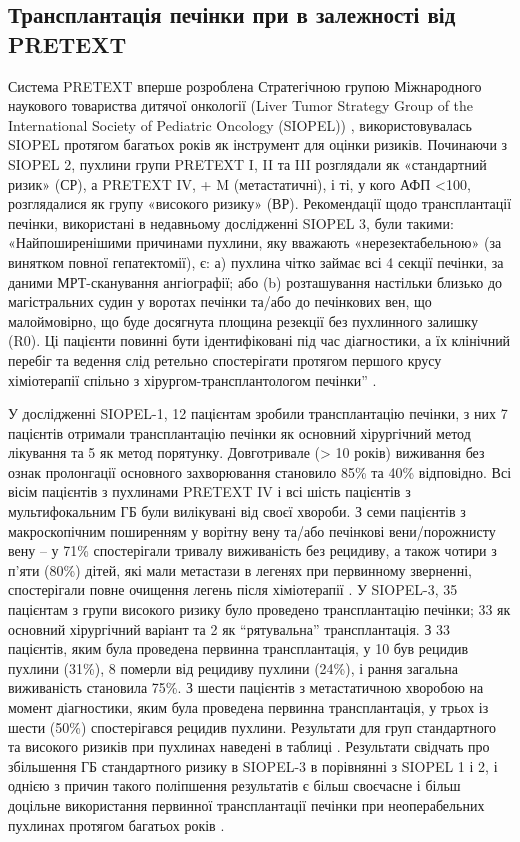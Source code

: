 \subsection{Трансплантація печінки при в залежності від PRETEXT}
Система PRETEXT вперше розроблена Стратегічною групою Міжнародного наукового товариства дитячої онкології (Liver Tumor Strategy Group of the International Society of Pediatric Oncology (SIOPEL)) \cite{pmid24362406}, використовувалась SIOPEL протягом багатьох років як інструмент для оцінки ризиків. Починаючи з SIOPEL 2, пухлини групи PRETEXT I, II та III розглядали як «стандартний ризик» (СР), а PRETEXT IV, + M (метастатичні), і ті, у кого АФП <100, розглядалися  як групу «високого ризику» (ВР). Рекомендації щодо трансплантації печінки, використані в недавньому дослідженні SIOPEL 3, були такими: «Найпоширенішими причинами пухлини, яку вважають «нерезектабельною» (за винятком повної гепатектомії), є: а) пухлина чітко займає всі 4 секції печінки, за даними МРТ-сканування  ангіографії; або (b) розташування настільки близько до магістральних судин у воротах печінки та/або до печінкових вен, що малоймовірно, що буде досягнута площина резекції без пухлинного залишку (R0). Ці пацієнти повинні бути ідентифіковані під час діагностики, а їх клінічний перебіг та ведення слід ретельно спостерігати протягом першого крусу хіміотерапії спільно з хірургом-трансплантологом печінки” \cite{pmid14966739}.

У дослідженні SIOPEL-1, 12 пацієнтам зробили трансплантацію печінки, з них 7 пацієнтів отримали трансплантацію печінки як основний хірургічний метод лікування та 5 як метод порятунку. Довготривале (> 10 років) виживання без ознак пролонгації основного захворювання становило 85\% та 40\% відповідно. Всі вісім пацієнтів з пухлинами PRETEXT IV і всі шість пацієнтів з мультифокальним ГБ були вилікувані від своєї хвороби. З семи пацієнтів з макроскопічним поширенням у ворітну вену та/або печінкові вени/порожнисту вену – у 71\% спостерігали тривалу виживаність без рецидиву, а також чотири з п’яти (80\%) дітей, які мали метастази в легенях при первинному зверненні, спостерігали повне очищення легень після хіміотерапії \cite{pmid18560935}. У SIOPEL-3,  35 пацієнтам з групи високого ризику було проведено трансплантацію печінки; 33 як основний хірургічний варіант та 2 як “рятувальна” трансплантація. З 33 пацієнтів, яким була проведена первинна трансплантація, у 10 був рецидив пухлини (31\%), 8 померли від рецидиву пухлини (24\%), і рання загальна виживаність становила 75\%. З шести пацієнтів з метастатичною хворобою на момент діагностики, яким була проведена первинна трансплантація, у трьох із шести (50\%) спостерігався рецидив пухлини. Результати для груп стандартного та високого ризиків при пухлинах наведені в таблиці \cite{pmid12778356}. Результати свідчать про збільшення ГБ стандартного ризику в SIOPEL-3 в порівнянні з SIOPEL 1 і 2, і однією з причин такого поліпшення результатів є більш своєчасне і більш доцільне використання первинної трансплантації печінки при неоперабельних пухлинах протягом багатьох років \cite{pmid1323649}.

